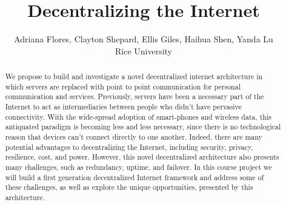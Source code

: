 \documentclass[journal]{IEEEtran}
\begin{document}
\title{Decentralizing the Internet}
\author{Adriana Flores, Clayton Shepard, Ellis Giles, Haihua Shen, Yanda Lu \\
Rice University
}
\maketitle

\begin{abstract}
We propose to build and investigate a novel decentralized internet architecture in which servers are replaced with point to point communication for personal communication and services. %
Previously, servers have been a necessary part of the Internet to act as intermediaries between people who didn't have pervasive connectivity.
With the wide-spread adoption of smart-phones and wireless data, this antiquated paradigm is becoming less and less necessary, since there is no technological reason that devices can't connect directly to one another.
Indeed, there are many potential advantages to decentralizing the Internet, including security, privacy, resilience, cost, and power.
However, this novel decentralized architecture also presents many challenges, such as redundancy, uptime, and failover.
In this course project we will build a first generation decentralized Internet framework and address some of these challenges, as well as explore the unique opportunities, presented by this architecture.
\end{abstract}






% 

\end{document}
